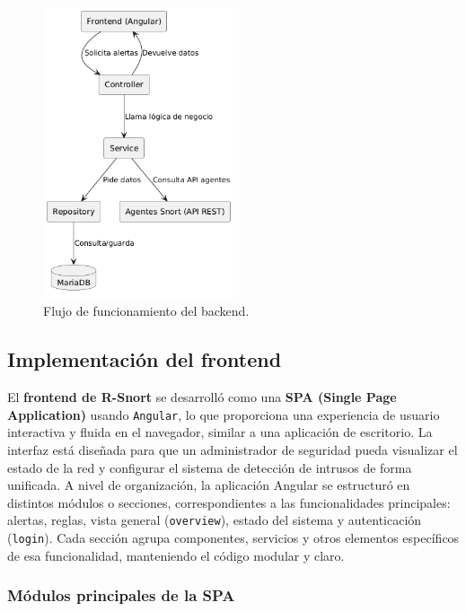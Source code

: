 \documentclass[11pt,a4paper,twoside]{report}
\begin{document}
\begin{figure}[htb]
	\centering
	\includegraphics[width=0.5\textwidth]{documento/27.png}
	\caption{Flujo de funcionamiento del backend.}
	\label{fig:esquema-backend}
\end{figure}

\newpage

\subsection{Implementación del frontend}
\label{sec:implementacion-frontend}

El \textbf{frontend de R-Snort} se desarrolló como una \textbf{SPA (Single Page Application)} usando \texttt{Angular}, lo que proporciona una experiencia de usuario interactiva y fluida en el navegador, similar a una aplicación de escritorio. La interfaz está diseñada para que un administrador de seguridad pueda visualizar el estado de la red y configurar el sistema de detección de intrusos de forma unificada. A nivel de organización, la aplicación Angular se estructuró en distintos módulos o secciones, correspondientes a las funcionalidades principales: alertas, reglas, vista general (\texttt{overview}), estado del sistema y autenticación (\texttt{login}). Cada sección agrupa componentes, servicios y otros elementos específicos de esa funcionalidad, manteniendo el código modular y claro.

\subsubsection*{Módulos principales de la SPA}
\end{document}
